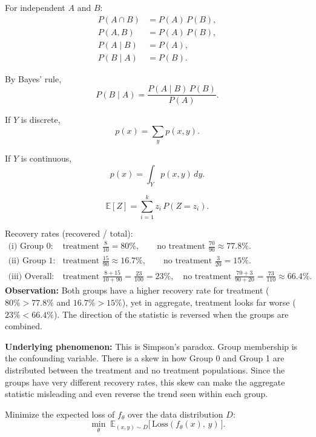 \documentclass{cisXXX} %
\begin{document}
\HWproblem
\HWsubproblem
For independent $A$ and $B$:
\begin{align*}
P(A \cap B) &= P(A)\,P(B), \\
P(A, B) &= P(A)\,P(B), \\
P(A \mid B) &= P(A), \\
P(B \mid A) &= P(B).
\end{align*}

\HWsubproblem
By Bayes' rule,
$$P(B \mid A) = \frac{P(A \mid B)\,P(B)}{P(A)}.$$

\HWsubproblem
If $Y$ is discrete,
$$p(x) = \sum_{y} p(x, y).$$

\HWsubproblem
If $Y$ is continuous,
$$p(x) = \int_Y p(x, y)\, dy.$$

\HWsubproblem
$$\mathbb{E}[Z] = \sum_{i=1}^{k} z_i\, P(Z = z_i).$$

\HWsubproblem
Recovery rates (recovered / total):
\begin{align*}
\text{(i) Group 0:} \quad & \text{treatment } \tfrac{8}{10} = 80\%, \qquad \text{no treatment } \tfrac{70}{90} \approx 77.8\%. \\
\text{(ii) Group 1:} \quad & \text{treatment } \tfrac{15}{90} \approx 16.7\%, \qquad \text{no treatment } \tfrac{3}{20} = 15\%. \\
\text{(iii) Overall:} \quad & \text{treatment } \tfrac{8+15}{10+90} = \tfrac{23}{100} = 23\%, \quad \text{no treatment } \tfrac{70+3}{90+20} = \tfrac{73}{110} \approx 66.4\%.
\end{align*}
\textbf{Observation:} Both groups have a higher recovery rate for treatment ($80\% > 77.8\%$ and $16.7\% > 15\%$), yet in aggregate, treatment looks far worse ($23\% < 66.4\%$). The direction of the statistic is reversed when the groups are combined.

\noindent\textbf{Underlying phenomenon:} This is Simpson's paradox. Group membership is the confounding variable. There is a skew in how Group 0 and Group 1 are distributed between the treatment and no treatment populations. Since the groups have very different recovery rates, this skew can make the aggregate statistic misleading and even reverse the trend seen within each group.

\HWproblem
\HWsubproblem
Minimize the expected loss of $f_\theta$ over the data distribution $D$:
$$\min_{\theta} \; \mathbb{E}_{(x,y) \sim D}\big[\,\mathrm{Loss}(f_\theta(x),\, y)\,\big].$$
\end{document}

